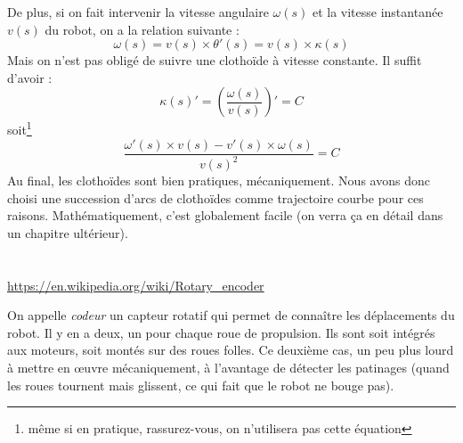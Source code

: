 \documentclass[11pt]{article}
\begin{document}
    De plus, si on fait intervenir la vitesse angulaire $\omega(s)$ et la vitesse instantanée $v(s)$ du robot, on a la relation suivante :
    \[\omega(s) = v(s) \times \theta'(s) = v(s) \times \kappa(s)\]
    Mais on n'est pas obligé de suivre une clothoïde à vitesse constante. Il suffit d'avoir :
    \[\kappa(s)' = \left(\frac{\omega(s)}{v(s)}\right)' = C\]
    soit\footnote{même si en pratique, rassurez-vous, on n'utilisera pas cette équation}
    \[\frac{\omega'(s) \times v(s) - v'(s) \times \omega(s)}{v(s)^2} = C\]
    Au final, les clothoïdes sont bien pratiques, mécaniquement. Nous avons donc choisi une succession d'arcs de clothoïdes comme trajectoire courbe pour ces raisons. Mathématiquement, c'est globalement facile (on verra ça en détail dans un chapitre ultérieur).

%
%
%


    \section{}

    \href{https://en.wikipedia.org/wiki/Rotary_encoder}{https://en.wikipedia.org/wiki/Rotary_encoder}


    On appelle \emph{codeur} un capteur rotatif qui permet de connaître les déplacements du robot. Il y en a deux, un pour chaque roue de propulsion. Ils sont soit intégrés aux moteurs, soit montés sur des roues folles. Ce deuxième cas, un peu plus lourd à mettre en œuvre mécaniquement, à l'avantage de détecter les patinages (quand les roues tournent mais glissent, ce qui fait que le robot ne bouge pas).
\end{document}
